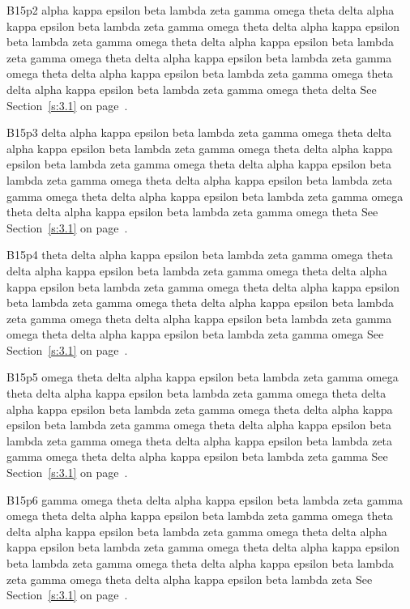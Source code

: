 B15p2 alpha kappa epsilon beta lambda zeta gamma omega theta delta alpha kappa epsilon beta lambda zeta gamma omega theta delta alpha kappa epsilon beta lambda zeta gamma omega theta delta alpha kappa epsilon beta lambda zeta gamma omega theta delta alpha kappa epsilon beta lambda zeta gamma omega theta delta alpha kappa epsilon beta lambda zeta gamma omega theta delta alpha kappa epsilon beta lambda zeta gamma omega theta delta See Section~\ref{s:3.1} on page~\pageref{s:3.1}.

B15p3 delta alpha kappa epsilon beta lambda zeta gamma omega theta delta alpha kappa epsilon beta lambda zeta gamma omega theta delta alpha kappa epsilon beta lambda zeta gamma omega theta delta alpha kappa epsilon beta lambda zeta gamma omega theta delta alpha kappa epsilon beta lambda zeta gamma omega theta delta alpha kappa epsilon beta lambda zeta gamma omega theta delta alpha kappa epsilon beta lambda zeta gamma omega theta See Section~\ref{s:3.1} on page~\pageref{s:3.1}.

B15p4 theta delta alpha kappa epsilon beta lambda zeta gamma omega theta delta alpha kappa epsilon beta lambda zeta gamma omega theta delta alpha kappa epsilon beta lambda zeta gamma omega theta delta alpha kappa epsilon beta lambda zeta gamma omega theta delta alpha kappa epsilon beta lambda zeta gamma omega theta delta alpha kappa epsilon beta lambda zeta gamma omega theta delta alpha kappa epsilon beta lambda zeta gamma omega See Section~\ref{s:3.1} on page~\pageref{s:3.1}.

B15p5 omega theta delta alpha kappa epsilon beta lambda zeta gamma omega theta delta alpha kappa epsilon beta lambda zeta gamma omega theta delta alpha kappa epsilon beta lambda zeta gamma omega theta delta alpha kappa epsilon beta lambda zeta gamma omega theta delta alpha kappa epsilon beta lambda zeta gamma omega theta delta alpha kappa epsilon beta lambda zeta gamma omega theta delta alpha kappa epsilon beta lambda zeta gamma See Section~\ref{s:3.1} on page~\pageref{s:3.1}.

B15p6 gamma omega theta delta alpha kappa epsilon beta lambda zeta gamma omega theta delta alpha kappa epsilon beta lambda zeta gamma omega theta delta alpha kappa epsilon beta lambda zeta gamma omega theta delta alpha kappa epsilon beta lambda zeta gamma omega theta delta alpha kappa epsilon beta lambda zeta gamma omega theta delta alpha kappa epsilon beta lambda zeta gamma omega theta delta alpha kappa epsilon beta lambda zeta See Section~\ref{s:3.1} on page~\pageref{s:3.1}.

